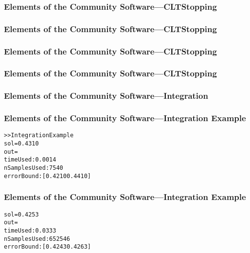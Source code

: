 \documentclass[11pt,compress,xcolor={usenames,dvipsnames},aspectratio=169]{beamer}
\newcommand{\ProgDir}{../../MATLAB_Prototype}
\begin{document}
\begin{frame}[fragile]
\frametitle{Elements of the Community Software---CLTStopping}
\vspace{-5ex}

\end{frame}


\begin{frame}[fragile]
\frametitle{Elements of the Community Software---CLTStopping}
\vspace{-5ex}

\end{frame}


\begin{frame}[fragile]
\frametitle{Elements of the Community Software---CLTStopping}
\vspace{-5ex}

\end{frame}

\begin{frame}[fragile]
\frametitle{Elements of the Community Software---CLTStopping}
\vspace{-5ex}

\end{frame}

\begin{frame}[fragile]
\frametitle{Elements of the Community Software---Integration}
\vspace{-5ex}

\end{frame}

\begin{frame}[fragile]
\frametitle{Elements of the Community Software---Integration Example}
\vspace{-5ex}


\begin{alltt}
>> IntegrationExample
sol = 0.4310
out = 
timeUsed: 0.0014
nSamplesUsed: 7540
errorBound: [0.4210 0.4410]
\end{alltt}
\end{frame}

\begin{frame}[fragile]
\frametitle{Elements of the Community Software---Integration Example}
\vspace{-5ex}


\begin{alltt}
sol = 0.4253
out = 
timeUsed: 0.0333
nSamplesUsed: 652546
errorBound: [0.4243 0.4263]
\end{alltt}
\end{frame}
\end{document}
